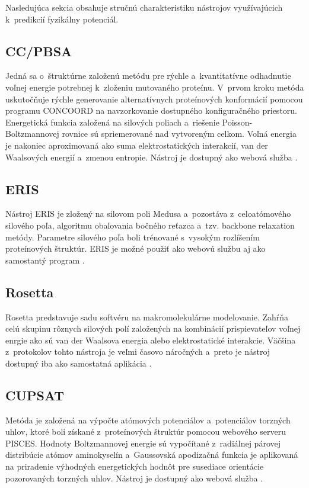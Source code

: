 Nasledujúca sekcia obsahuje stručnú charakteristiku nástrojov využívajúcich k~predikcií fyzikálny potenciál.

\subsection{CC/PBSA}

Jedná sa o~štruktúrne založenú metódu pre rýchle a~kvantitatívne odhadnutie voľnej energie potrebnej k~zloženiu mutovaného proteínu. V~prvom kroku metóda uskutočňuje rýchle generovanie alternatívnych proteínových konformácií pomocou programu CONCOORD na navzorkovanie dostupného konfiguračného priestoru. Energetická funkcia založená na silových poliach a~riešenie Poisson-Boltzmannovej rovnice sú spriemerované nad vytvoreným celkom. Voľná energia je nakoniec aproximovaná ako suma elektrostatických interakcií, van der Waalsových energií a~zmenou entropie. Nástroj je dostupný ako webová služba \cite{ccpbsa}. 

\subsection{ERIS}

Nástroj ERIS je zložený na silovom poli Medusa a~pozostáva z~celoatómového silového poľa, algoritmu obaľovania bočného reťazca a~tzv. backbone relaxation metódy. Parametre silového poľa boli trénované s~vysokým rozlíšením proteínových štruktúr. ERIS je možné použiť ako webovú službu aj ako samostantý program \cite{eris}.

\subsection{Rosetta}

Rosetta predstavuje sadu softvéru na makromolekulárne modelovanie. Zahŕňa celú skupinu rôznych silových polí založených na kombinácií prispievateľov voľnej enrgie ako sú van der Waalsova energia alebo elektrostatické interakcie. Väčšina z~protokolov tohto nástroja je veľmi časovo náročných a~preto je nástroj dostupný iba ako samostatná aplikácia \cite{rosetta}.

\subsection{CUPSAT}

Metóda je založená na výpočte atómových potenciálov a~potenciálov torzných uhlov, ktoré boli získané z~proteínových štruktúr pomocou webového serveru PISCES. Hodnoty Boltzmannovej energie sú vypočítané z~radiálnej párovej distribúcie atómov aminokyselín a~Gaussovská apodizačná funkcia je aplikovaná na priradenie výhodných energetických hodnôt pre susediace orientácie pozorovaných torzných uhlov. Nástroj je dostupný ako webová služba \cite{cupsat}.  

